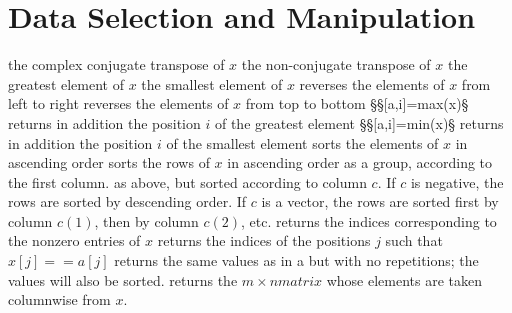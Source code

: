 \section{Data Selection and Manipulation}{}
	{the complex conjugate transpose of $x$}
	{the non-conjugate transpose of $x$}
	{the greatest element of $x$}
	{the smallest element of $x$}
	{reverses the elements of $x$ from left to right}
	{reverses the elements of $x$ from top to bottom}
§§[a,i]=max(x)§ returns in addition the position $i$ of the greatest element
§§[a,i]=min(x)§ returns in addition the position $i$ of the smallest element
	{sorts the elements of $x$ in ascending order}
	{sorts the rows of $x$ in ascending order as a group, according to the first column.}
	{as above, but sorted according to column $c$. If $c$ is negative, the rows are sorted by descending order. If $c$ is a vector, the rows are sorted first by column $c(1)$, then by column $c(2)$, etc.}
	{returns the indices corresponding to the nonzero entries of $x$}
	{returns the indices of the positions $j$ such that $x[j]==a[j]$}
	{returns the same values as in a but with no repetitions; the values will also be sorted.}
	{returns the $m  \times  n matrix$ whose elements are taken columnwise from $x$.}

